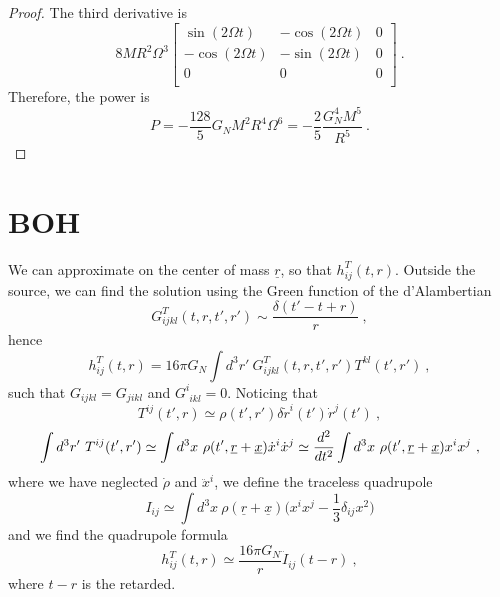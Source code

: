     \begin{proof}
        The third derivative is 
        \begin{equation*}
            8 M R^2 \Omega^3 \begin{bmatrix}
                \sin (2 \Omega t) & - \cos(2 \Omega t) & 0 \\
                - \cos (2 \Omega t) & - \sin(2 \Omega t) & 0 \\
                0 & 0 & 0 \\
            \end{bmatrix} ~.
        \end{equation*}
        Therefore, the power is 
        \begin{equation*}
            P = - \frac{128}{5} G_N M^2 R^4 \Omega^6 = - \frac{2}{5} \frac{G_N^4 M^5}{R^5} ~.
        \end{equation*}
    \end{proof}

\section{BOH}
    We can approximate on the center of mass $\underline r$, so that $h^T_{ij} (t, r)$. Outside the source, we can find the solution using the Green function of the d'Alambertian 
    \begin{equation*}
        G^T_{ijkl}(t, r, t', r') \sim \frac{\delta(t'-t+r)}{r} ~,
    \end{equation*}
    hence 
    \begin{equation*}
        h_{ij}^T(t,r) = 16 \pi G_N \int d^3 r' ~ G^T_{ijkl}(t, r, t', r') T^{kl} (t', r') ~,
    \end{equation*}
    such that $G_{ijkl} = G_{jikl}$ and $G^i_{\phantom i i k l} = 0$. Noticing that 
    \begin{equation*}
        T^{ij} (t', r) \simeq \rho(t', r')\delta \dot r^i (t') \dot r^j (t') ~,
    \end{equation*}
    \begin{equation*}
        \int d^3 r' ~ T^{ij} (t', r') \simeq \int d^3 x ~ \rho (t', \underline r + \underline x)\dot x^i \dot x^j \simeq \frac{d^2}{dt^2} \int d^3 x ~ \rho (t', \underline r + \underline x) x^i x^j ~,
    \end{equation*}
    where we have neglected $\dot \rho$ and $\ddot x^i$, we define the traceless quadrupole 
    \begin{equation*}
        I_{ij} \simeq \int d^3 x ~ \rho(\underline r + \underline x) \Big(x^i x^j - \frac{1}{3} \delta_{ij}x^2 \Big ) 
    \end{equation*}
    and we find the quadrupole formula 
    \begin{equation*}
        h^T_{ij} (t,r) \simeq \frac{16 \pi G_N}{r} \ddot I_{ij} (t-r) ~,
    \end{equation*}
    where $t - r$ is the retarded.

